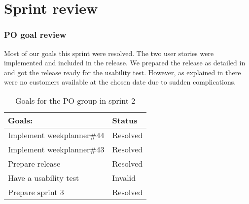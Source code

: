 \section{Sprint review}


\subsubsection{PO goal review}
Most of our goals this sprint were resolved.
The two user stories were implemented and included in the release. 
We prepared the release as detailed in  and got the release ready for the usability test.
However, as explained in  there were no customers available at the chosen date due to sudden complications.


\begin{table}[H]
    \centering
    \begin{tabular}{|l|l|}
    \hline
    Goals:                                   & Status \\ \hline
    Implement weekplanner\#44                & Resolved  \\ \hline
    Implement weekplanner\#43                & Resolved  \\ \hline
    Prepare release                          & Resolved \\ \hline
    Have a usability test                   & Invalid \\ \hline
    Prepare sprint 3                         & Resolved \\ \hline
    \end{tabular}
    \caption{Goals for the PO group in sprint 2}
    \label{PO-goal-sprint-2-review}
\end{table}
